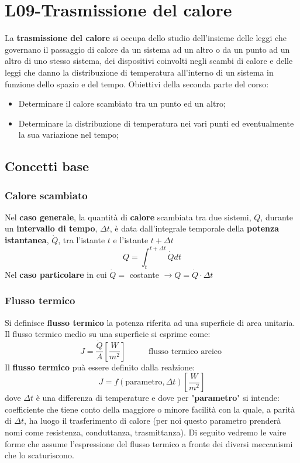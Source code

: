 \section{L09-Trasmissione del calore}
La \textbf{trasmissione del calore} si occupa dello studio dell’insieme delle leggi che governano il passaggio di calore da un sistema ad un altro o da un punto ad un altro di uno stesso sistema, dei dispositivi coinvolti negli scambi di calore e delle leggi che danno la distribuzione di temperatura all’interno di un sistema in funzione dello spazio e del tempo.\newline
\newline
Obiettivi della seconda parte del corso:
\begin{itemize}
    \item Determinare il calore scambiato tra un punto ed un altro;
    \item Determinare la distribuzione di temperatura nei vari punti ed eventualmente la sua variazione nel tempo;
\end{itemize}
\subsection{Concetti base}
\subsubsection{Calore scambiato}
Nel \textbf{caso generale}, la quantità di \textbf{calore} scambiata tra due sistemi, $Q$, durante
un \textbf{intervallo di tempo}, $\Delta t$, è data dall’integrale temporale della \textbf{potenza
istantanea}, $\dot{Q}$, tra l’istante $t$ e l’istante $t + \Delta t$
\[
    Q = \int_{t}^{t+\Delta t} \dot{Q}dt
\]
Nel \textbf{caso particolare} in cui $\dot{Q}=$ costante $\rightarrow Q = \dot{Q} \cdot \Delta t$
\subsubsection{Flusso termico}
Si definisce \textbf{flusso termico} la potenza riferita ad una superficie di area
unitaria. Il flusso termico medio su una superficie si esprime come:
\[
    J = \frac{\dot{Q}}{A} \left[\frac{W}{m^2}\right] \;\;\;\;\;\;\;\;\;\;\text{flusso termico areico}\;
\]
Il \textbf{flusso termico} puà essere definito dalla realzione:
\[
    J = f(\text{parametro}, \Delta t) \left[\frac{W}{m^2}\right]
\]
dove $\Delta t$ è una differenza di temperature e dove per "\textbf{parametro}" si intende: coefficiente che tiene conto della maggiore o minore facilità con la quale, a parità di $\Delta t$, ha luogo il trasferimento di calore (per noi questo parametro prenderà nomi come resistenza, conduttanza, trasmittanza).\newline
\newline
Di seguito vedremo le vaire forme che assume l'espressione del flusso termico a fronte dei diversi meccanismi che lo scaturiscono.
